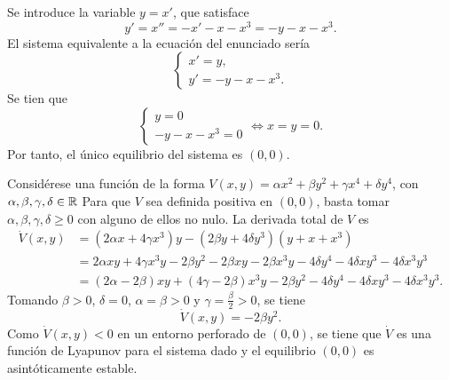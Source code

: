 \documentclass[11pt]{report}
\begin{document}
\begin{solution}
    Se introduce la variable $y = x'$, que satisface
    \[y' = x'' = -x'-x-x^3 = -y-x-x^3.\]
    El sistema equivalente a la ecuación del enunciado sería
    \[\begin{cases}
        x' = y, \\
        y' = -y-x-x^3.
    \end{cases}\]
    Se tien que
    \[\begin{cases}
        y = 0 \\
        -y-x-x^3 = 0
    \end{cases} \iff x = y = 0.\]
    Por tanto, el único equilibrio del sistema es $(0,0)$. 

    Considérese una función de la forma $V(x,y) = \alpha x^2+\beta y^2 + \gamma x^4 + \delta y^4$, con $\alpha,\beta,\gamma,\delta\in\mathbb R$ Para que $V$ sea definida positiva en $(0,0)$, basta tomar $\alpha,\beta,\gamma,\delta \geq 0$ con alguno de ellos no nulo. La derivada total de $V$ es
    \begin{align*}
        \dot{V}(x,y) &= (2\alpha x + 4\gamma x^3)y - (2\beta y + 4\delta y^3)(y+x+x^3) \\
        &= 2\alpha xy + 4\gamma x^3y-2\beta y^2-2\beta xy-2\beta x^3y -4\delta y^4-4\delta xy^3-4\delta x^3y^3 \\
        &= (2\alpha-2\beta)xy + (4\gamma-2\beta)x^3y - 2\beta y^2-4\delta y^4-4\delta xy^3-4\delta x^3y^3.
    \end{align*}
    Tomando $\beta > 0$, $\delta = 0$, $\alpha = \beta > 0$ y $\gamma = \frac{\beta}{2} > 0$, se tiene
    \[\dot{V}(x,y) = - 2\beta y^2.\]
    Como $\dot{V}(x,y) < 0$ en un entorno perforado de $(0,0)$, se tiene que $\dot{V}$ es una función de Lyapunov para el sistema dado y el equilibrio $(0,0)$ es asintóticamente estable.
\end{solution}

\addtocounter{exercise}{-5}
\end{document}
